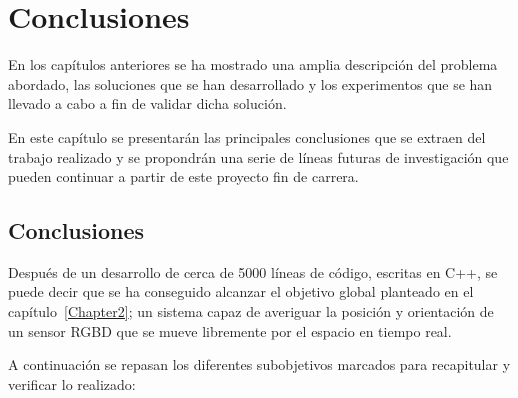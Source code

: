 
\chapter{Conclusiones}

\label{Chapter6} %

En los capítulos anteriores se ha mostrado una amplia descripción del problema abordado, las soluciones que se han desarrollado y los experimentos que se han llevado a cabo a fin de validar dicha solución.

En este capítulo se presentarán las principales conclusiones que se extraen del trabajo realizado y se propondrán una serie de líneas futuras de investigación que pueden continuar a partir de este proyecto fin de carrera.

\section{Conclusiones}

Después de un desarrollo de cerca de 5000 líneas de código, escritas en C++, se puede decir que se ha conseguido alcanzar el objetivo global planteado en el capítulo~\ref{Chapter2}; un sistema capaz de averiguar la posición y orientación de un sensor RGBD que se mueve libremente por el espacio en tiempo real.

A continuación se repasan los diferentes subobjetivos marcados para recapitular y verificar lo realizado:



